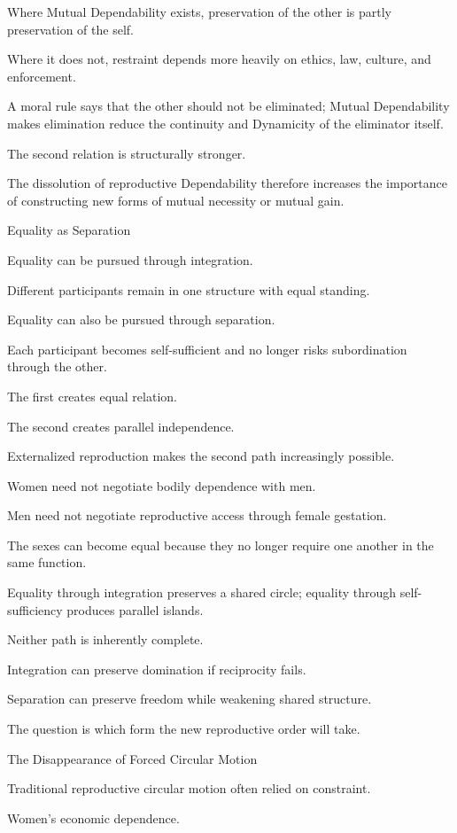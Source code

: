 Where Mutual Dependability exists, preservation of the other is partly preservation of the self.

Where it does not, restraint depends more heavily on ethics, law, culture, and enforcement.

A moral rule says that the other should not be eliminated; Mutual Dependability makes elimination reduce the continuity and Dynamicity of the eliminator itself.

The second relation is structurally stronger.

The dissolution of reproductive Dependability therefore increases the importance of constructing new forms of mutual necessity or mutual gain.

Equality as Separation

Equality can be pursued through integration.

Different participants remain in one structure with equal standing.

Equality can also be pursued through separation.

Each participant becomes self-sufficient and no longer risks subordination through the other.

The first creates equal relation.

The second creates parallel independence.

Externalized reproduction makes the second path increasingly possible.

Women need not negotiate bodily dependence with men.

Men need not negotiate reproductive access through female gestation.

The sexes can become equal because they no longer require one another in the same function.

Equality through integration preserves a shared circle; equality through self-sufficiency produces parallel islands.

Neither path is inherently complete.

Integration can preserve domination if reciprocity fails.

Separation can preserve freedom while weakening shared structure.

The question is which form the new reproductive order will take.

The Disappearance of Forced Circular Motion

Traditional reproductive circular motion often relied on constraint.

Women’s economic dependence.

